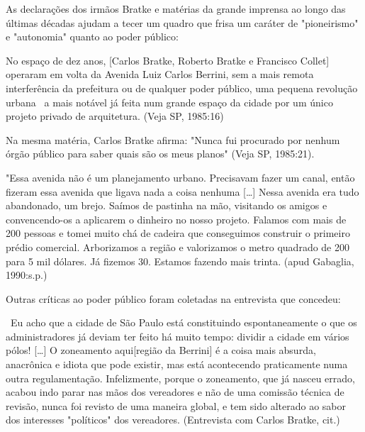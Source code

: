 \documentclass[11pt,fleqn]{book} %
\begin{document}
\begin{citacao}
	As declarações dos irmãos Bratke e matérias da grande imprensa ao longo das últimas décadas ajudam a tecer um quadro que frisa um caráter de "pioneirismo" e "autonomia" quanto ao poder público:
	
	\begin{citacao}
		No espaço de dez anos, [Carlos Bratke, Roberto Bratke e Francisco Collet] operaram em volta da Avenida Luiz Carlos Berrini, sem a mais remota interferência da prefeitura ou de qualquer poder público, uma pequena revolução urbana \textemdash\ a mais notável já feita num grande espaço da cidade por um único projeto privado de arquitetura. (Veja SP, 1985:16)
	\end{citacao}
	
	Na mesma matéria, Carlos Bratke afirma: "Nunca fui procurado por nenhum órgão público para saber quais são os meus planos" (Veja SP, 1985:21).
	
	\begin{citacao}		
		"Essa avenida não é um planejamento urbano. Precisavam fazer um canal, então fizeram essa avenida que ligava nada a coisa nenhuma [\dots] Nessa avenida era tudo abandonado, um brejo. Saímos de pastinha na mão, visitando os amigos e convencendo-os a aplicarem o dinheiro no nosso projeto. Falamos com mais de 200 pessoas e tomei muito chá de cadeira que conseguimos construir o primeiro prédio comercial. Arborizamos a região e valorizamos o metro quadrado de 200 para 5 mil dólares. Já fizemos 30. Estamos fazendo mais trinta. (apud Gabaglia, 1990:s.p.)
	\end{citacao}
	
	Outras críticas ao poder público foram coletadas na entrevista que concedeu:
	
	\begin{citacao}
		\textemdash\ Eu acho que a cidade de São Paulo está constituindo espontaneamente o que os administradores já deviam ter feito há muito tempo: dividir a cidade em vários pólos! [\dots] O zoneamento aqui[região da Berrini] é a coisa mais absurda, anacrônica e idiota que pode existir, mas está acontecendo praticamente numa outra regulamentação. Infelizmente, porque o zoneamento, que já nasceu errado, acabou indo parar nas mãos dos vereadores e não de uma comissão técnica de revisão, nunca foi revisto de uma maneira global, e tem sido alterado ao sabor dos interesses "políticos" dos vereadores. (Entrevista com Carlos Bratke, cit.)
	\end{citacao}	
\end{citacao}
\end{document}
